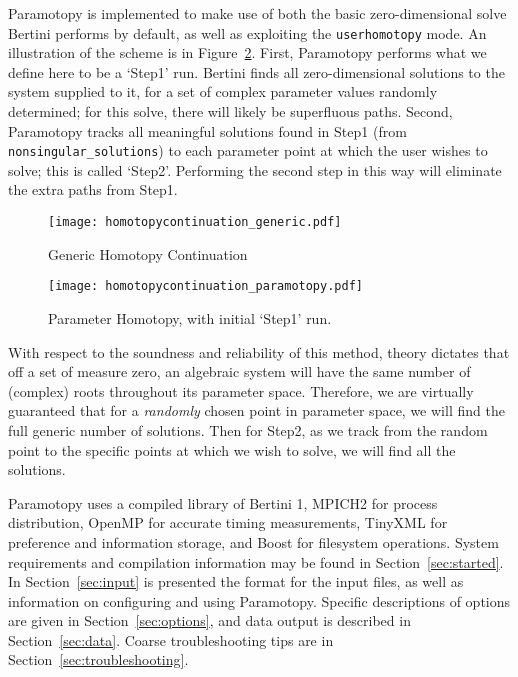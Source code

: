 Paramotopy is implemented to make use of both the basic zero-dimensional solve Bertini performs by default, as well as exploiting the \texttt{userhomotopy} mode.  An illustration of the scheme is in Figure~\ref{fig:paramotopy_homotopy_continuation}.  First, Paramotopy performs what we define here to be a `Step1' run.  Bertini finds all zero-dimensional solutions to the system supplied to it, for a set of complex parameter values randomly determined; for this solve, there will likely be superfluous paths.  Second, Paramotopy tracks all meaningful solutions found in Step1 (from \texttt{nonsingular\_solutions}) to each parameter point at which the user wishes to solve; this is called `Step2'. Performing the second step in this way will eliminate the extra paths from Step1.  
  
\begin{figure}[h]
\begin{center}
\texttt{[image: homotopycontinuation\_generic.pdf]}
\caption[Generic Homotopy Continuation]{Generic Homotopy Continuation}
\label{fig:generic_homotopy_continuation}
\end{center}
\end{figure}


\begin{figure}[t]
\begin{center}
\texttt{[image: homotopycontinuation\_paramotopy.pdf]}
\caption[Parameter Homotopy]{Parameter Homotopy, with initial `Step1' run.}
\label{fig:paramotopy_homotopy_continuation}
\end{center}
\end{figure}

With respect to the soundness and reliability of this method, theory dictates that off a set of measure zero, an algebraic system will have the same number of (complex) roots throughout its parameter space.  Therefore, we are virtually guaranteed that for a \emph{randomly} chosen point in parameter space, we will find the full generic number of solutions.  Then for Step2, as we track from the random point to the specific points at which we wish to solve, we will find all the solutions.

Paramotopy uses a compiled library of Bertini 1, MPICH2 for process distribution, OpenMP for accurate timing measurements, TinyXML for preference and information storage, and Boost for filesystem operations.  System requirements and compilation information may be found in Section~\ref{sec:started}.  In Section~\ref{sec:input} is presented the format for the input files, as well as information on configuring and using Paramotopy.  Specific descriptions of options are given in Section~\ref{sec:options}, and data output is described in Section~\ref{sec:data}.  Coarse troubleshooting tips are in Section~\ref{sec:troubleshooting}.
  




